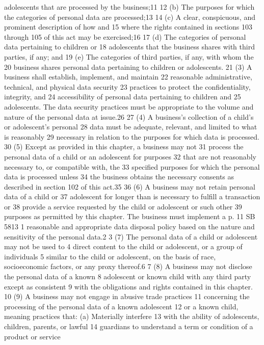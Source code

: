 adolescents that are processed by the business;11
12 (b) The purposes for which the categories of personal data are
processed;13
14 (c) A clear, conspicuous, and prominent description of how and
15 where the rights contained in sections 103 through 105 of this act
may be exercised;16
17 (d) The categories of personal data pertaining to children or
18 adolescents that the business shares with third parties, if any; and
19 (e) The categories of third parties, if any, with whom the
20 business shares personal data pertaining to children or adolescents.
21 (3) A business shall establish, implement, and maintain
22 reasonable administrative, technical, and physical data security
23 practices to protect the confidentiality, integrity, and
24 accessibility of personal data pertaining to children and
25 adolescents. The data security practices must be appropriate to the
volume and nature of the personal data at issue.26
27 (4) A business's collection of a child's or adolescent's personal
28 data must be adequate, relevant, and limited to what is reasonably
29 necessary in relation to the purposes for which data is processed.
30 (5) Except as provided in this chapter, a business may not
31 process the personal data of a child or an adolescent for purposes
32 that are not reasonably necessary to, or compatible with, the
33 specified purposes for which the personal data is processed unless
34 the business obtains the necessary consents as described in section
102 of this act.35
36 (6) A business may not retain personal data of a child or
37 adolescent for longer than is necessary to fulfill a transaction or
38 provide a service requested by the child or adolescent or such other
39 purposes as permitted by this chapter. The business must implement a
p. 11 SB 5813
1 reasonable and appropriate data disposal policy based on the nature
and sensitivity of the personal data.2
3 (7) The personal data of a child or adolescent may not be used to
4 direct content to the child or adolescent, or a group of individuals
5 similar to the child or adolescent, on the basis of race,
socioeconomic factors, or any proxy thereof.6
7 (8) A business may not disclose the personal data of a known
8 adolescent or known child with any third party except as consistent
9 with the obligations and rights contained in this chapter.
10 (9) A business may not engage in abusive trade practices
11 concerning the processing of the personal data of a known adolescent
12 or a known child, meaning practices that: (a) Materially interfere
13 with the ability of adolescents, children, parents, or lawful
14 guardians to understand a term or condition of a product or service
